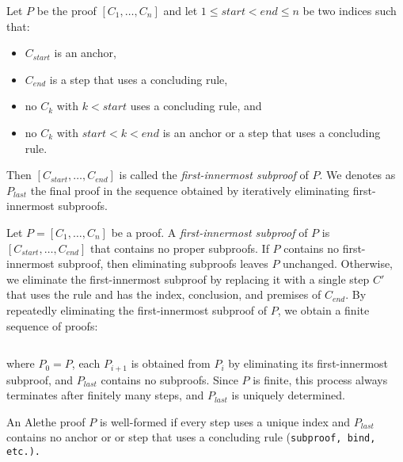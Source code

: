 \begin{definition}\label{def:first-innermost}
Let $P$ be the proof $[C_1, \ldots, C_n]$ and let $1 \leq \mathit{start} < \mathit{end} \leq n$ be two indices such
that:
\begin{itemize}
\item $C_{\mathit{start}}$ is an anchor,
\item $C_{\mathit{end}}$ is a step that uses a concluding rule,
\item no $C_k$ with $k < \mathit{start}$ uses a concluding rule, and
\item no $C_k$ with $\mathit{start} < k < \mathit{end}$ is an anchor or a step that uses a concluding rule.
\end{itemize}
Then $[C_{\mathit{start}}, \ldots, C_{\mathit{end}}]$ is called the \emph{first-innermost subproof} of $P$.
We denotes as $P_{last}$ the final proof in the sequence obtained by iteratively eliminating first-innermost subproofs.
\end{definition}

\begin{definition}
Let $P = [C_1, \ldots, C_n]$ be a proof. 
A \emph{first-innermost subproof} of $P$ is $[C_{\mathit{start}}, \ldots, C_{\mathit{end}}]$ that contains no proper subproofs.
If $P$ contains no first-innermost subproof, then eliminating subproofs leaves $P$ unchanged. 
Otherwise, we eliminate the first-innermost subproof by replacing it with a single step $C'$  that uses the  rule and has the index, conclusion, and premises of $C_{\mathit{end}}$. 
By repeatedly eliminating the first-innermost subproof of $P$, we obtain a finite sequence of proofs:

\begin{equation*}
[P_0, P_1, P_2, \ldots, P_{\mathit{last}}]  
\end{equation*}

where $P_0 = P$, each $P_{i+1}$ is obtained from $P_i$ by eliminating its 
first-innermost subproof, and $P_{\mathit{last}}$ contains no subproofs. 
Since $P$ is finite, this process always terminates after finitely many steps, 
and $P_{\mathit{last}}$ is uniquely determined.
\end{definition}

\begin{definition}\label{def:well-formed-alethe}
An Alethe proof $P$ is well-formed if every step uses a unique index and $P_{last}$ contains no anchor or
or step that uses a concluding rule (\tt{subproof}, \tt{bind}, etc.).
\end{definition}

